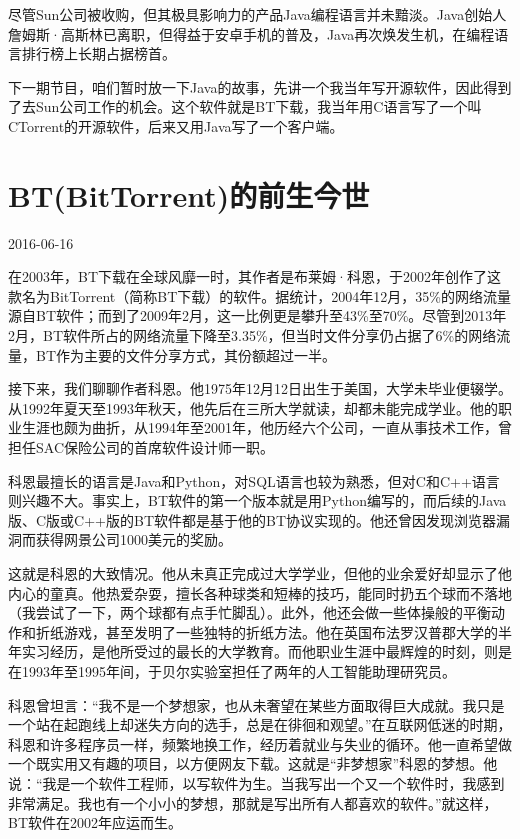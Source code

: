 \documentclass[
  letterpaper,
  DIV=11,
  numbers=noendperiod]{scrreprt}
\begin{document}
尽管Sun公司被收购，但其极具影响力的产品Java编程语言并未黯淡。Java创始人詹姆斯·高斯林已离职，但得益于安卓手机的普及，Java再次焕发生机，在编程语言排行榜上长期占据榜首。

下一期节目，咱们暂时放一下Java的故事，先讲一个我当年写开源软件，因此得到了去Sun公司工作的机会。这个软件就是BT下载，我当年用C语言写了一个叫CTorrent的开源软件，后来又用Java写了一个客户端。


\chapter{BT(BitTorrent)的前生今世}\label{btbittorrentux7684ux524dux751fux4ecaux4e16}

2016-06-16

在2003年，BT下载在全球风靡一时，其作者是布莱姆·科恩，于2002年创作了这款名为BitTorrent（简称BT下载）的软件。据统计，2004年12月，35\%的网络流量源自BT软件；而到了2009年2月，这一比例更是攀升至43\%至70\%。尽管到2013年2月，BT软件所占的网络流量下降至3.35\%，但当时文件分享仍占据了6\%的网络流量，BT作为主要的文件分享方式，其份额超过一半。

接下来，我们聊聊作者科恩。他1975年12月12日出生于美国，大学未毕业便辍学。从1992年夏天至1993年秋天，他先后在三所大学就读，却都未能完成学业。他的职业生涯也颇为曲折，从1994年至2001年，他历经六个公司，一直从事技术工作，曾担任SAC保险公司的首席软件设计师一职。

科恩最擅长的语言是Java和Python，对SQL语言也较为熟悉，但对C和C++语言则兴趣不大。事实上，BT软件的第一个版本就是用Python编写的，而后续的Java版、C版或C++版的BT软件都是基于他的BT协议实现的。他还曾因发现浏览器漏洞而获得网景公司1000美元的奖励。

这就是科恩的大致情况。他从未真正完成过大学学业，但他的业余爱好却显示了他内心的童真。他热爱杂耍，擅长各种球类和短棒的技巧，能同时扔五个球而不落地（我尝试了一下，两个球都有点手忙脚乱）。此外，他还会做一些体操般的平衡动作和折纸游戏，甚至发明了一些独特的折纸方法。他在英国布法罗汉普郡大学的半年实习经历，是他所受过的最长的大学教育。而他职业生涯中最辉煌的时刻，则是在1993年至1995年间，于贝尔实验室担任了两年的人工智能助理研究员。

科恩曾坦言：``我不是一个梦想家，也从未奢望在某些方面取得巨大成就。我只是一个站在起跑线上却迷失方向的选手，总是在徘徊和观望。''在互联网低迷的时期，科恩和许多程序员一样，频繁地换工作，经历着就业与失业的循环。他一直希望做一个既实用又有趣的项目，以方便网友下载。这就是``非梦想家''科恩的梦想。他说：``我是一个软件工程师，以写软件为生。当我写出一个又一个软件时，我感到非常满足。我也有一个小小的梦想，那就是写出所有人都喜欢的软件。''就这样，BT软件在2002年应运而生。
\end{document}
